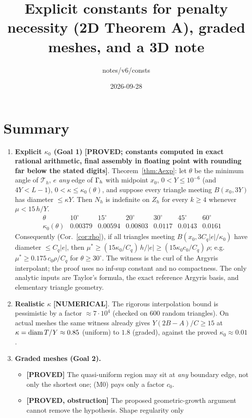 \documentclass[11pt]{article}
\title{Explicit constants for penalty necessity (2D Theorem A), graded meshes, and a 3D note}
\date{2026-09-28}\author{notes/v6/consts}
\theoremstyle{remark}\newtheorem{remark}[theorem]{Remark}
\newcommand{\lab}[1]{\textbf{[#1]}}
\newcommand{\Th}{\mathcal T_h}\newcommand{\Zh}{Z_h}\newcommand{\VR}{V_h^R}\newcommand{\EG}{\mathcal E_\Gamma}
\begin{document}
\maketitle

\section*{Summary}
\begin{enumerate}[label=(\arabic*)]
\item \textbf{Explicit $\kappa_0$ (Goal 1)} \lab{PROVED; constants computed in exact rational arithmetic, final
  assembly in floating point with rounding far below the stated digits}.
  Theorem~\ref{thm:Aexp}: let $\theta$ be the minimum angle of $\Th$, $e$ \emph{any} edge of $\Gamma_h$ with midpoint $x_0$,
  $0<Y\le10^{-6}$ (and $4Y<L-1$), $0<\kappa\le\kappa_0(\theta)$, and suppose every triangle meeting $B(x_0,3Y)$ has
  diameter $\le\kappa Y$. Then $N_h$ is indefinite on $\Zh$ for every $k\ge4$ whenever $\mu<15\,h/Y$.
  \[\begin{array}{c|cccccc}\theta&10^\circ&15^\circ&20^\circ&30^\circ&45^\circ&60^\circ\\\hline
  \kappa_0(\theta)&0.00379&0.00594&0.00803&0.0117&0.0143&0.0161\end{array}\]
  Consequently (Cor.~\ref{cor:rho}), if all triangles meeting $B(x_0,3C_q|e|/\kappa_0)$ have diameter $\le C_q|e|$, then
  $\mu^\ast\ge(15\kappa_0/C_q)\,h/|e|\ge(15\kappa_0c_0/C_q)\,\rho$; e.g.\ $\mu^\ast\ge0.175\,c_0\rho/C_q$ for $\theta\ge30^\circ$.
  The witness is the curl of the Argyris interpolant; the proof uses no inf-sup constant and no compactness. The only
  analytic inputs are Taylor's formula, the exact reference Argyris basis, and elementary triangle geometry.
\item \textbf{Realistic $\kappa$} \lab{NUMERICAL}. The rigorous interpolation bound is pessimistic by a factor
  $\approx7\cdot10^4$ (checked on 600 random triangles). On actual meshes the same witness already gives
  $Y(2B-A)/C\ge15$ at $\kappa=\operatorname{diam} T/Y\approx0.85$ (uniform) to $1.8$ (graded), against the proved $\kappa_0\approx0.01$.
\item \textbf{Graded meshes (Goal 2).}
  \begin{itemize}
  \item \lab{PROVED} The quasi-uniform region may sit at \emph{any} boundary edge, not only the shortest one; (M0) pays only a
    factor $c_0$.
  \item \lab{PROVED, obstruction} The proposed geometric-growth argument cannot remove the hypothesis. Shape regularity only

\end{itemize}
\end{enumerate}
\end{document}
